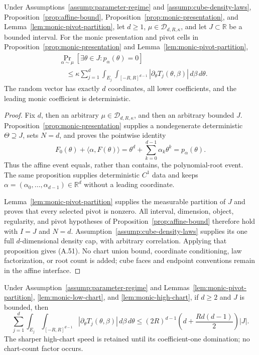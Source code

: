 \begin{proposition}
\label{prop:monic-affine-transfer}
Under Assumptions~\ref{assump:parameter-regime} and
\ref{assump:cube-density-laws}, Proposition~\ref{prop:affine-bound},
Proposition~\ref{prop:monic-presentation}, and
Lemma~\ref{lem:monic-pivot-partition}, let $d\geq1$,
$\mu\in\mathcal D_{d,R,\kappa}$, and let $J\subset\mathbb R$ be a bounded
interval.  For the monic presentation and pivot cells in
Proposition~\ref{prop:monic-presentation} and
Lemma~\ref{lem:monic-pivot-partition},
\[
\begin{aligned}
&\Pr_{\alpha\sim\mu}
[\exists\theta\in J:p_\alpha(\theta)=0]\\
&\quad\leq\kappa\sum_{j=1}^d
\int_{E_j}\int_{[-R,R]^{d-1}}
|\partial_\theta T_j(\theta,\beta)|\,d\beta\,d\theta.
\end{aligned}
\tag{A.51}
\]
The random vector has exactly $d$ coordinates, all lower coefficients, and
the leading monic coefficient is deterministic.
\end{proposition}

\begin{proof}
Fix $d$, then an arbitrary $\mu\in\mathcal D_{d,R,\kappa}$, and then an
arbitrary bounded $J$.  Proposition~\ref{prop:monic-presentation} supplies a
nondegenerate deterministic $\Theta\supseteq J$, sets $N=d$, and proves the
pointwise identity
\[
F_0(\theta)+\langle\alpha,F(\theta)\rangle
=\theta^d+\sum_{k=0}^{d-1}\alpha_k\theta^k
=p_\alpha(\theta).
\tag{A.52}
\]
Thus the affine event equals, rather than contains, the polynomial-root
event.  The same proposition supplies deterministic $C^1$ data and keeps
$\alpha=(\alpha_0,\ldots,\alpha_{d-1})\in\mathbb R^d$ without a leading
coordinate.

Lemma~\ref{lem:monic-pivot-partition} supplies the measurable partition of
$J$ and proves that every selected pivot is nonzero.  All interval,
dimension, object, regularity, and pivot hypotheses of
Proposition~\ref{prop:affine-bound} therefore hold with $I=J$ and $N=d$.
Assumption~\ref{assump:cube-density-laws} supplies its one full
$d$-dimensional density cap, with arbitrary correlation.  Applying that
proposition gives (A.51).  No chart union bound, coordinate conditioning,
law factorization, or root count is added; cube faces and endpoint
conventions remain in the affine interface.
\end{proof}

\begin{lemma}
\label{lem:monic-two-cell-ledger}
Under Assumption~\ref{assump:parameter-regime} and
Lemmas~\ref{lem:monic-pivot-partition},
\ref{lem:monic-low-chart}, and
\ref{lem:monic-high-chart}, if $d\geq2$ and $J$ is bounded, then
\[
\sum_{j=1}^d\int_{E_j}\int_{[-R,R]^{d-1}}
|\partial_\theta T_j(\theta,\beta)|\,d\beta\,d\theta
\leq(2R)^{d-1}
\left(d+\frac{Rd(d-1)}2\right)|J|.
\tag{A.53}
\]
The sharper high-chart speed is retained until its coefficient-one
domination; no chart-count factor occurs.
\end{lemma}

